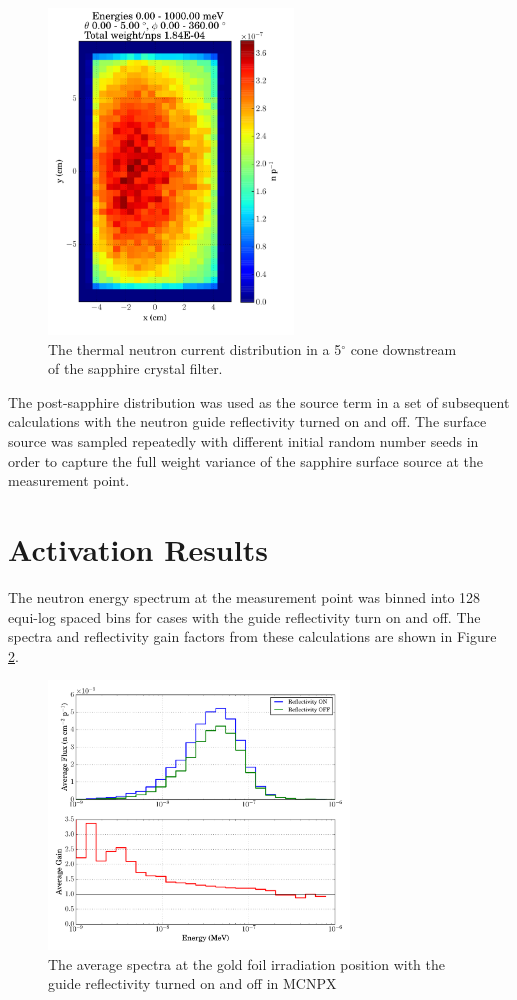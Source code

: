 \documentclass[a4paper,
              ]{jacow}
\begin{document}
\begin{figure}[!htb]
   \centering
   \includegraphics*[trim = 0mm 8mm 0mm 2.5mm, width=65mm]{graphics/sappdist.pdf}
   \caption{The thermal neutron current distribution in a 5$^\circ$ cone downstream of the sapphire crystal filter.}
   \label{sappdist}
\end{figure}

The post-sapphire distribution was used as the source term in a set of subsequent calculations with the neutron guide reflectivity turned on and off.  The surface source was sampled repeatedly with different initial random number seeds in order to capture the full weight variance of the sapphire surface source at the measurement point.

\section{Activation Results}

The neutron energy spectrum at the measurement point was binned into 128 equi-log spaced bins for cases with the guide reflectivity turn on and off.  The spectra and reflectivity gain factors from these calculations are shown in Figure \ref{gain}.  

\begin{figure}[!htb]
   \centering
   \includegraphics*[trim = 0mm 0mm 0mm 0mm, width=80mm]{graphics/gain.pdf}
   \caption{The average spectra at the gold foil irradiation position with the guide reflectivity turned on and off in MCNPX}
   \label{gain}
\end{figure}
\end{document}
